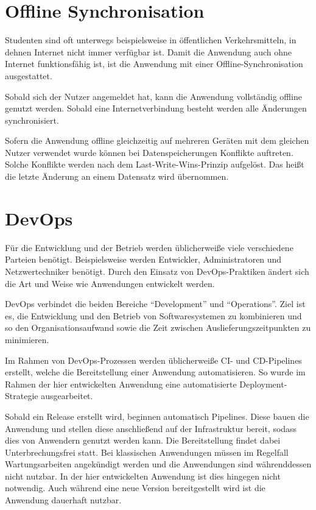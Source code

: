 \section{Offline Synchronisation}
Studenten sind oft unterwegs beispielsweise in öffentlichen Verkehrsmitteln, in dehnen Internet nicht immer verfügbar ist.
Damit die Anwendung auch ohne Internet funktionsfähig ist, ist die Anwendung mit einer Offline-Synchronisation ausgestattet.

Sobald sich der Nutzer angemeldet hat, kann die Anwendung vollständig offline genutzt werden.
Sobald eine Internetverbindung besteht werden alle Änderungen synchronisiert.

Sofern die Anwendung offline gleichzeitig auf mehreren Geräten mit dem gleichen Nutzer verwendet wurde können bei Datenspeicherungen Konflikte auftreten.
Solche Konflikte werden nach dem Last-Write-Wins-Prinzip aufgelöst.
Das heißt die letzte Änderung an einem Datensatz wird übernommen.


\section{DevOps}
Für die Entwicklung und der Betrieb werden üblicherweiße viele verschiedene Parteien benötigt.
Beispielsweise werden Entwickler, Administratoren und Netzwertechniker benötigt.
Durch den Einsatz von DevOps-Praktiken ändert sich die Art und Weise wie Anwendungen entwickelt werden.

DevOps verbindet die beiden Bereiche \enquote{Development} und \enquote{Operations}.
Ziel ist es, die Entwicklung und den Betrieb von Softwaresystemen zu kombinieren und so den Organisationsaufwand sowie die Zeit zwischen Auslieferungszeitpunkten zu minimieren.\autocite[][S. 156]{Artac2018}

Im Rahmen von DevOps-Prozessen werden üblicherweiße \ac{CI}- und \ac{CD}-Pipelines erstellt, welche die Bereitstellung einer Anwendung automatisieren.
So wurde im Rahmen der hier entwickelten Anwendung eine automatisierte Deployment-Strategie ausgearbeitet.

Sobald ein Release erstellt wird, beginnen automatisch Pipelines.
Diese bauen die Anwendung und stellen diese anschließend auf der Infrastruktur bereit, sodass dies von Anwendern genutzt werden kann.
Die Bereitstellung findet dabei Unterbrechungsfrei statt.
Bei klassischen Anwendungen müssen im Regelfall Wartungsarbeiten angekündigt werden und die Anwendungen sind währenddessen nicht nutzbar.
In der hier entwickelten Anwendung ist dies hingegen nicht notwendig.
Auch während eine neue Version bereitgestellt wird ist die Anwendung dauerhaft nutzbar.

